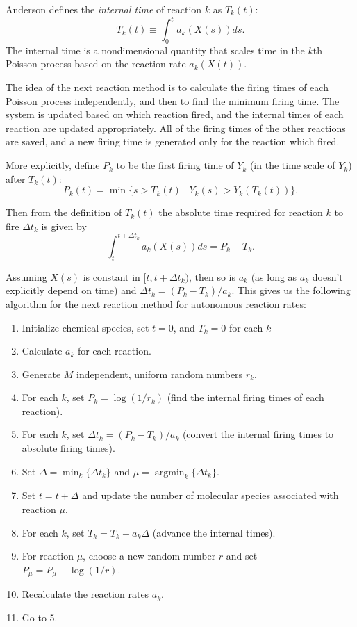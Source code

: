Anderson defines the \emph{internal time} of reaction $k$ as $T_k(t)$:
\begin{equation}
  \label{eq:T-def}
  T_k(t) \equiv \int_0^t a_k(X(s)) ds.
\end{equation}
The internal time is a nondimensional quantity that scales time in the
$k$th Poisson process based on the reaction rate $a_k(X(t))$.

The idea of the next reaction method is to calculate the firing times
of each Poisson process independently, and then to find the minimum
firing time. The system is updated based on which reaction fired, and
the internal times of each reaction are updated appropriately. All of
the firing times of the other reactions are saved, and a new firing
time is generated only for the reaction which fired.

More explicitly, define $P_k$ to be the first firing time of $Y_k$ (in
the time scale of $Y_k$) after $T_k(t)$:
\begin{equation}
  \label{eq:P-def}
  P_k(t) = \min\{s > T_k(t) \mid Y_k(s) > Y_k(T_k(t)) \}.
\end{equation}

Then from the definition of $T_k(t)$ the absolute time required for
reaction $k$ to fire $\Delta t_k$ is given by
\begin{equation}
  \label{eq:dtk-def}
  \int_t^{t + \Delta t_k} a_k(X(s)) ds = P_k - T_k.
\end{equation}


Assuming $X(s)$ is constant in $[t, t + \Delta t_k)$, then so is $a_k$
(as long as $a_k$ doesn't explicitly depend on time) and
$\Delta t_k = (P_k - T_k)/a_k$. This gives us the following algorithm
for the next reaction method for autonomous reaction rates:
\begin{enumerate}
\item Initialize chemical species, set $t=0$, and $T_k = 0$ for
  each $k$
\item Calculate $a_k$ for each reaction.
\item Generate $M$ independent, uniform random numbers $r_k$.
\item For each $k$, set $P_k = \log(1/r_k)$ (find the internal firing
  times of each reaction).
\item For each $k$, set $\Delta t_k = (P_k - T_k)/a_k$ (convert the
  internal firing times to absolute firing times).
\item Set $\Delta = \min_k \{\Delta t_k\}$ and
  $\mu = \operatorname{argmin}_k \{\Delta t_k\}$.
\item Set $t = t + \Delta$ and update the number of molecular species
  associated with reaction $\mu$.
\item For each $k$, set $T_k = T_k + a_k \Delta$ (advance the internal
  times).
\item For reaction $\mu$, choose a new random number $r$ and set
  $P_\mu = P_\mu + \log(1/r)$.
\item Recalculate the reaction rates $a_k$.
\item Go to 5.
\end{enumerate}


